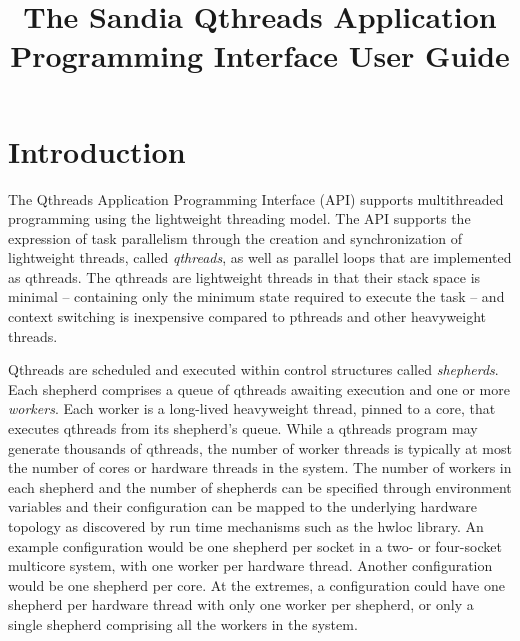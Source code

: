 \documentclass[12pt,fullpage]{article}
\title{The Sandia Qthreads Application Programming Interface User Guide}
\begin{document}
\lstset{language=C,basicstyle=\ttfamily\footnotesize,frame=single}
\maketitle

\section{Introduction}
The Qthreads Application Programming Interface (API) supports multithreaded programming using the lightweight threading model.  The API supports the expression of task parallelism through the creation and synchronization of lightweight threads, called {\it qthreads}, as well as parallel loops that are implemented as qthreads.  The qthreads are lightweight threads in that their stack space is minimal -- containing only the minimum state required to execute the task -- and context switching is inexpensive compared to pthreads and other heavyweight threads.

Qthreads are scheduled and executed within control structures called {\it shepherds}.  Each shepherd comprises a queue of qthreads awaiting execution and one or more {\it workers}.  Each worker is a long-lived heavyweight thread, pinned to a core, that executes qthreads from its shepherd's queue.  While a qthreads program may generate thousands of qthreads, the number of worker threads is typically at most the number of cores or hardware threads in the system.  The number of workers in each shepherd and the number of shepherds can be specified through environment variables and their configuration can be mapped to the underlying hardware topology as discovered by run time mechanisms such as the hwloc library.  An example configuration would be one shepherd per socket in a two- or four-socket multicore system, with one worker per hardware thread.  Another configuration would be one shepherd per core.  At the extremes, a configuration could have one shepherd per hardware thread with only one worker per shepherd, or only a single shepherd comprising all the workers in the system.
\end{document}
